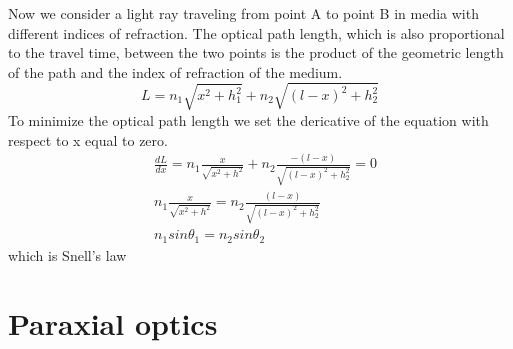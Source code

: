 \documentclass[../main.tex]{subfiles}
\begin{document}
	Now we consider a light ray traveling from point A to point B in media with different indices of refraction. The optical path length, which is also proportional to the travel time, between the two points is the product of the geometric length of the path and the index of refraction of the medium.
	\begin{equation}
		L = n_1\sqrt{x^2+h_1^2}+n_2\sqrt{(l-x)^2+h_2^2}
	\end{equation}
	To minimize the optical path length we set the dericative of the equation with respect to x equal to zero.
	\begin{align}
		&\frac{dL}{dx}=n_1\frac{x}{\sqrt{x^2+h^2}}+n_2\frac{-(l-x)}{\sqrt{(l-x)^2+h_2^2}}=0\\
		&n_1\frac{x}{\sqrt{x^2+h^2}}=n_2\frac{(l-x)}{\sqrt{(l-x)^2+h_2^2}}\\
		&n_1sin\theta_1=n_2sin\theta_2
	\end{align} 
	which is Snell's law
	\section{Paraxial optics}
\end{document}
